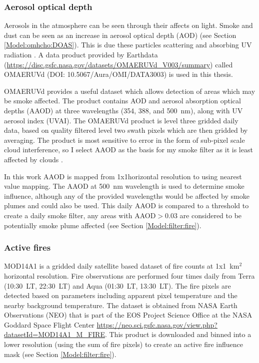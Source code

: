     \subsubsection{Aerosol optical depth}
      \label{Model:datasets:OMAERUVd}
      
      Aerosols in the atmosphere can be seen through their affects on light. 
      Smoke and dust can be seen as an increase in aerosol optical depth (AOD) (see Section \ref{Model:omhcho:DOAS}).
      This is due these particles scattering and absorbing UV radiation \parencite{Ahn2008}.
      A data product provided by Earthdata (\url{https://disc.gsfc.nasa.gov/datasets/OMAERUVd_V003/summary}) called OMAERUVd (DOI: 10.5067/Aura/OMI/DATA3003) is used in this thesis. 
      
      
      OMAERUVd provides a useful dataset which allows detection of areas which may be smoke affected.
      The product contains AOD and aerosol absorption optical depths (AAOD) at three wavelengths (354, 388, and 500~nm), along with UV aerosol index (UVAI).
      The OMAERUVd product is level three gridded daily data, based on quality filtered level two swath pixels which are then gridded by averaging.
      The product is most sensitive to error in the form of sub-pixel scale cloud interference, so I select AAOD as the basis for my smoke filter as it is least affected by clouds \parencite{Ahn2008}.
      
      In this work AAOD is mapped from 1x1\degr horizontal resolution to \highhr using nearest value mapping.
      The AAOD at 500~nm wavelength is used to determine smoke influence, although any of the provided wavelengths would be affected by smoke plumes and could also be used.
      This daily AAOD is compared to a threshold to create a daily smoke filter, any areas with AAOD$>0.03$ are considered to be potentially smoke plume affected (see Section \ref{Model:filter:fire}).
    
    \subsubsection{Active fires}
      \label{Model:datasets:MOD14A1}
      MOD14A1 is a gridded daily satellite based dataset of fire counts at 1x1~km$^2$ horizontal resolution.
      Fire observations are performed four times daily from Terra (10:30~LT, 22:30~LT) and Aqua (01:30~LT, 13:30~LT).
      The fire pixels are detected based on parameters including apparent pixel temperature and the nearby background temperature.
      The dataset is obtained from NASA Earth Observations (NEO) that is part of the EOS Project Science Office at the NASA Goddard Space Flight Center \url{https://neo.sci.gsfc.nasa.gov/view.php?datasetId=MOD14A1_M_FIRE}.
      This product is downloaded and binned into a lower resolution (using the sum of fire pixels) to create an active fire influence mask (see Section \ref{Model:filter:fire}).
      
